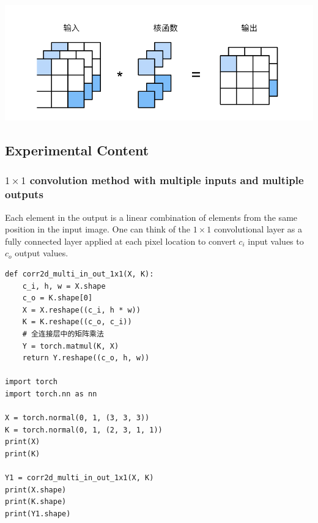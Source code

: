 \documentclass[a4paper,12pt]{article}
\begin{document}
\centering %
\includegraphics[width=0.8\linewidth]{images/1x1.png}

\justifying


\subsection{Experimental Content}
\subsubsection{$1 \times 1$ convolution method with multiple inputs and multiple outputs}
Each element in the output is a linear combination of elements from the same position in the input image. One can think of the $1 \times 1$
convolutional layer as a fully connected layer applied at each pixel location to convert $c_i $ input values to $c_o $ output values.
\begin{lstlisting}
def corr2d_multi_in_out_1x1(X, K):
    c_i, h, w = X.shape
    c_o = K.shape[0]
    X = X.reshape((c_i, h * w))
    K = K.reshape((c_o, c_i))
    # 全连接层中的矩阵乘法
    Y = torch.matmul(K, X)
    return Y.reshape((c_o, h, w))

import torch
import torch.nn as nn

X = torch.normal(0, 1, (3, 3, 3))
K = torch.normal(0, 1, (2, 3, 1, 1))
print(X)
print(K)

Y1 = corr2d_multi_in_out_1x1(X, K)
print(X.shape)
print(K.shape)
print(Y1.shape)

\end{lstlisting}
\end{document}
